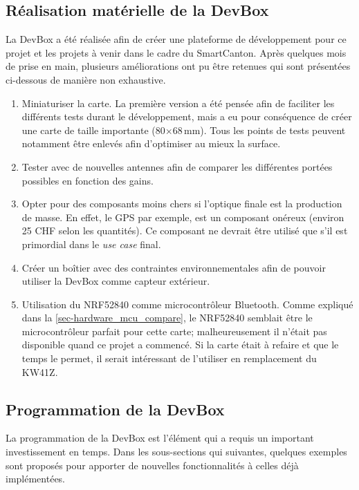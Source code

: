 \subsection{Réalisation matérielle de la DevBox}

La DevBox a été réalisée afin de créer une plateforme de développement pour ce projet et les projets à venir dans le cadre du SmartCanton. Après quelques mois de prise en main, plusieurs améliorations ont pu être retenues qui sont présentées ci-dessous de manière non exhaustive.

\begin{enumerate}
    \item Miniaturiser la carte. La première version a été pensée afin de faciliter les différents tests durant le développement, mais a eu pour conséquence de créer une carte de taille importante (80$\times$68\,mm). Tous les points de tests peuvent notamment être enlevés afin d'optimiser au mieux la surface. 
    
    \item Tester avec de nouvelles antennes afin de comparer les différentes portées possibles en fonction des gains.
    
    \item Opter pour des composants moins chers si l'optique finale est la production de masse. En effet, le GPS par exemple, est un composant onéreux (environ 25 CHF selon les quantités). Ce composant ne devrait être utilisé que s'il est primordial dans le \textit{use case} final. 
    
    \item Créer un boîtier avec des contraintes environnementales afin de pouvoir utiliser la DevBox comme capteur extérieur.
    
    \item Utilisation du NRF52840 comme microcontrôleur Bluetooth. Comme expliqué dans la \cref{sec-hardware_mcu_compare}, le NRF52840 semblait être le microcontrôleur parfait pour cette carte; malheureusement il n'était pas disponible quand ce projet a commencé. Si la carte était à refaire et que le temps le permet, il serait intéressant de l'utiliser en remplacement du KW41Z.
\end{enumerate}


\subsection{Programmation de la DevBox}
\label{sec-improvements_devbox}
La programmation de la DevBox est l'élément qui a requis un important investissement en temps. Dans les sous-sections qui suivantes, quelques exemples sont proposés pour apporter de nouvelles fonctionnalités à celles déjà implémentées.


